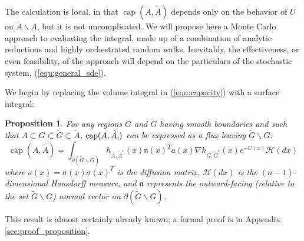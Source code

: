\documentclass[12pt, nofootinbib,english, amsmath, amssymb, aps, priprint, graphicx,floatfix]{revtex4-1}
\newtheorem{proposition}{Proposition}
\theoremstyle{plain}
\theoremstyle{definition}
\theoremstyle{plain}
\newcommand{\normal}{{\mathfrak{n}}}
\newcommand{\capac}[2]{\ensuremath{\operatorname{cap}}(#1,#2)}
\newcommand{\hausdorffmeasure}{\mathscr{H}(dx)}
\newcommand{\tA}{{\tilde A}}
\begin{document}
The calculation is local, in that $\capac{A}{\tilde{A}}$ depends only on the behavior of  $U$ on $\tA\backslash A$, but it is not uncomplicated. We will propose here a Monte Carlo approach to evaluating the integral, made up of a combination of analytic reductions and highly orchestrated random walks. Inevitably, the effectiveness, or even feasibility, of the approach will depend on the particulars of the stochastic system, (\ref{equ:general_sde}).

We begin by replacing the volume integral in (\ref{eqn:capacity}) with a surface integral:

\begin{proposition}
\label{prop:flux}
For any regions $G$ and $\tilde{G}$ having smooth boundaries and such that $A\subset G \subset \tilde G \subset \tilde A$, $\capac{A,\tA}$ can be expressed as a flux leaving $\tilde G \backslash G$:
\begin{equation}
\label{eqn:GIntegral}
\ensuremath{\operatorname{cap}} (A, \tilde{A}) = \int_{\partial (\tilde G \backslash G)}  h_{A, \tilde{A}^c} (x)   \normal(x)^T a (x) \nabla h_{G, \tilde{G}^c} (x)e^{- U (x)} \hausdorffmeasure
\end{equation}
where $a(x)=\sigma(x)\sigma(x)^T$ is the diffusion matrix, $\hausdorffmeasure$ is the $(n-1)$-dimensional Hausdorff measure, and $\normal$ represents the outward-facing (relative to the set $\tilde G \backslash G$) normal vector on $\partial (\tilde G \backslash G)$.
\end{proposition}
\noindent This result is almost certainly already known; a formal proof is in Appendix \ref{sec:proof_proposition}.
\end{document}

